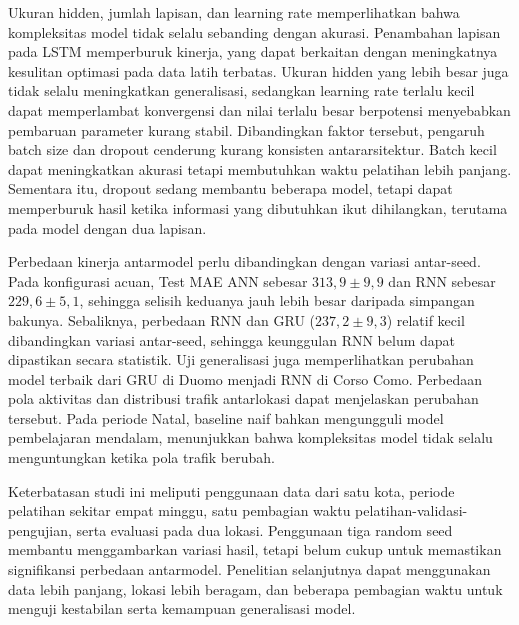 \documentclass[conference,a4paper]{IEEEtran}
\begin{document}
Ukuran hidden, jumlah lapisan, dan learning rate memperlihatkan bahwa kompleksitas model tidak selalu sebanding dengan akurasi. Penambahan lapisan pada LSTM memperburuk kinerja, yang dapat berkaitan dengan meningkatnya kesulitan optimasi pada data latih terbatas. Ukuran hidden yang lebih besar juga tidak selalu meningkatkan generalisasi, sedangkan learning rate terlalu kecil dapat memperlambat konvergensi dan nilai terlalu besar berpotensi menyebabkan pembaruan parameter kurang stabil. Dibandingkan faktor tersebut, pengaruh batch size dan dropout cenderung kurang konsisten antararsitektur. Batch kecil dapat meningkatkan akurasi tetapi membutuhkan waktu pelatihan lebih panjang. Sementara itu, dropout sedang membantu beberapa model, tetapi dapat memperburuk hasil ketika informasi yang dibutuhkan ikut dihilangkan, terutama pada model dengan dua lapisan.

Perbedaan kinerja antarmodel perlu dibandingkan dengan variasi antar-seed. Pada konfigurasi acuan, Test MAE ANN sebesar $313{,}9 \pm 9{,}9$ dan RNN sebesar $229{,}6 \pm 5{,}1$, sehingga selisih keduanya jauh lebih besar daripada simpangan bakunya. Sebaliknya, perbedaan RNN dan GRU ($237{,}2 \pm 9{,}3$) relatif kecil dibandingkan variasi antar-seed, sehingga keunggulan RNN belum dapat dipastikan secara statistik. Uji generalisasi juga memperlihatkan perubahan model terbaik dari GRU di Duomo menjadi RNN di Corso Como. Perbedaan pola aktivitas dan distribusi trafik antarlokasi dapat menjelaskan perubahan tersebut. Pada periode Natal, baseline naif bahkan mengungguli model pembelajaran mendalam, menunjukkan bahwa kompleksitas model tidak selalu menguntungkan ketika pola trafik berubah.

Keterbatasan studi ini meliputi penggunaan data dari satu kota, periode pelatihan sekitar empat minggu, satu pembagian waktu pelatihan-validasi-pengujian, serta evaluasi pada dua lokasi. Penggunaan tiga random seed membantu menggambarkan variasi hasil, tetapi belum cukup untuk memastikan signifikansi perbedaan antarmodel. Penelitian selanjutnya dapat menggunakan data lebih panjang, lokasi lebih beragam, dan beberapa pembagian waktu untuk menguji kestabilan serta kemampuan generalisasi model.


\end{document}
